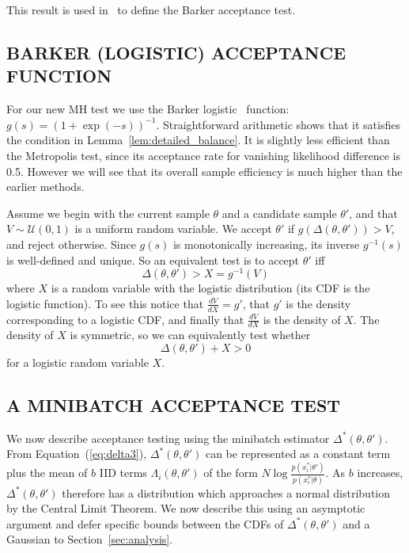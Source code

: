 \documentclass[letterpaper]{article}
\begin{document}
This result is used in~\citep{Barker65} to define the Barker acceptance test.

\subsection{BARKER (LOGISTIC) ACCEPTANCE FUNCTION}\label{ssec:barker_function}
For our new MH test we use the Barker logistic~\citep{Barker65}
function: $g(s)=(1+\exp(-s))^{-1}$. Straightforward arithmetic shows
that it satisfies the condition in Lemma~\ref{lem:detailed_balance}.
It is slightly less efficient than the Metropolis test, since its
acceptance rate for vanishing likelihood difference is 0.5. However we
will see that its overall sample efficiency is much higher than the
earlier methods.

Assume we begin with the current sample $\theta$ and a candidate sample
$\theta'$, and that $V \sim \mathcal{U}(0,1)$ is a uniform random variable. We
accept $\theta'$ if $g(\Delta(\theta,\theta')) > V$, and reject otherwise.
Since $g(s)$ is monotonically increasing, its inverse $g^{-1}(s)$ is
well-defined and unique. So an equivalent test is to accept $\theta'$ iff
\begin{equation}\label{eq:equivalent_test}
    \Delta(\theta,\theta') > X = g^{-1}(V)
\end{equation}
where $X$ is a random variable with the logistic distribution (its CDF is the
logistic function). To see this notice that $\frac{dV}{dX} = g'$, that $g'$ is
the density corresponding to a logistic CDF, and finally that $\frac{dV}{dX}$ is
the density of $X$. The density of $X$ is symmetric, so we can equivalently test
whether
\begin{equation}\label{eq:the_exact_test}
    \Delta(\theta,\theta') + X > 0
\end{equation}
for a logistic random variable $X$.


\subsection{A MINIBATCH ACCEPTANCE TEST}\label{ssec:deltas_minibatch}

We now describe acceptance testing using the minibatch estimator
$\Delta^*(\theta,\theta')$. From Equation~(\ref{eq:delta3}),
$\Delta^*(\theta,\theta')$ can be represented as a constant term plus the mean
of $b$ IID terms $\Lambda_i(\theta,\theta')$ of the form
$N\log\frac{p(x_i^*|\theta')}{p(x_i^*|\theta)}$. As $b$ increases,
$\Delta^*(\theta,\theta')$ therefore has a distribution which approaches a
normal distribution by the Central Limit Theorem. We now describe this using an
asymptotic argument and defer specific bounds between the CDFs of
$\Delta^*(\theta,\theta')$ and a Gaussian to Section~\ref{sec:analysis}.
\end{document}
